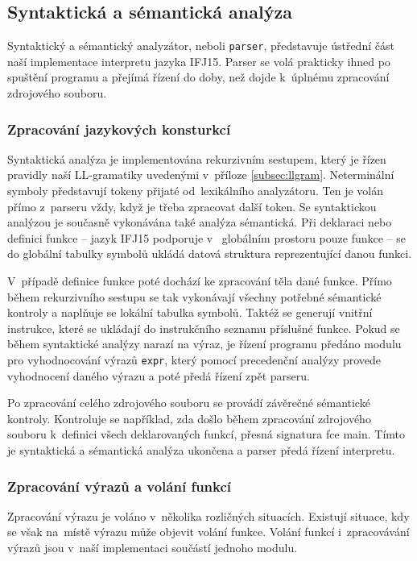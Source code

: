 \documentclass[a4paper, 12pt]{article}
\begin{document}
\subsection{Syntaktická a sémantická analýza} \label{parser}

Syntaktický a sémantický analyzátor, neboli \texttt{parser}, představuje ústřední
část naší implementace interpretu jazyka IFJ15. Parser se volá prakticky ihned po
spuštění programu a přejímá řízení do doby, než dojde k~úplnému zpracování
zdrojového souboru.

\subsubsection{Zpracování jazykových konsturkcí}
Syntaktická analýza je implementována rekurzivním sestupem, který je řízen
pravidly naší LL-gramatiky uvedenými v~příloze \ref{subsec:llgram}.
Neterminální symboly představují tokeny přijaté od~lexikálního analyzátoru.
Ten je volán přímo z~parseru vždy, když je třeba
zpracovat další token. Se syntaktickou analýzou je současně vykonávána také
analýza sémantická. Při deklaraci nebo definici funkce -- jazyk IFJ15 podporuje v~
globálním prostoru pouze funkce -- se do globální tabulky symbolů ukládá datová
struktura reprezentující danou funkci.

V~případě definice funkce poté dochází ke zpracování těla dané funkce.
Přímo během rekurzivního sestupu se tak vykonávají všechny potřebné
sémantické kontroly a naplňuje se lokální tabulka symbolů. Taktéž se generují
vnitřní instrukce, které se ukládají do instrukčního seznamu příslušné funkce.
Pokud se během syntaktické analýzy narazí na výraz, je řízení programu předáno
modulu pro vyhodnocování výrazů \texttt{expr}, který pomocí precedenční analýzy
provede vyhodnocení daného výrazu a poté předá řízení zpět parseru.

Po zpracování celého zdrojového souboru se provádí závěrečné sémantické
kontroly. Kontroluje se například, zda došlo během zpracování zdrojového
souboru k~definici všech deklarovaných funkcí, přesná signatura fce main.
Tímto je syntaktická a sémantická analýza ukončena a parser předá řízení interpretu.


\subsubsection{Zpracování výrazů a volání funkcí}
Zpracování výrazu je voláno v~několika rozličných situacích. Existují situace,
kdy se však na~místě výrazu může objevit volání funkce. Volání funkcí i~zpracovávání
výrazů jsou v~naší implementaci součástí jednoho modulu.
\end{document}
